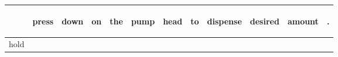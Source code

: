 \documentclass[landscape]{article}
\newcommand{\ssp}{\hspace{2pt}}
\begin{document}
\noindent\begin{tabular}{|l|p{10pt}|p{10pt}|p{10pt}|p{10pt}|p{10pt}|p{10pt}|p{10pt}|p{10pt}|p{10pt}|p{10pt}|p{10pt}|}
\hline
&\begin{sideways}\cellcolor{ref0}press\hspace{12pt}\end{sideways}&\begin{sideways}\cellcolor{ref1}down\hspace{12pt}\end{sideways}&\begin{sideways}\cellcolor{ref2}on\hspace{12pt}\end{sideways}&\begin{sideways}\cellcolor{ref3}the\hspace{12pt}\end{sideways}&\begin{sideways}\cellcolor{ref4}pump\hspace{12pt}\end{sideways}&\begin{sideways}\cellcolor{ref5}head\hspace{12pt}\end{sideways}&\begin{sideways}\cellcolor{ref6}to\hspace{12pt}\end{sideways}&\begin{sideways}\cellcolor{ref7}dispense\hspace{12pt}\end{sideways}&\begin{sideways}\cellcolor{ref8}desired\hspace{12pt}\end{sideways}&\begin{sideways}\cellcolor{ref9}amount\hspace{12pt}\end{sideways}&\begin{sideways}\cellcolor{ref10}.\hspace{12pt}\end{sideways}\\
\hline
\ssp hold \ssp&\hspace{2pt}&\hspace{2pt}&\hspace{2pt}&\hspace{2pt}&\hspace{2pt}&\hspace{2pt}&\hspace{2pt}&\hspace{2pt}&\hspace{2pt}&\hspace{2pt}&\hspace{2pt}\\

\end{tabular}
\end{document}
